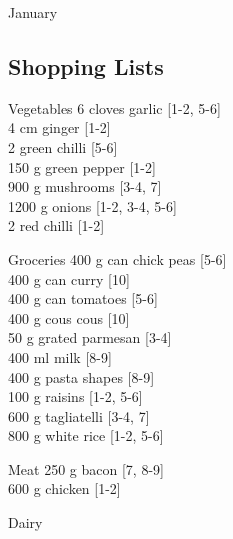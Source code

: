 \begin{menu}{January}
    \subsection*{Shopping Lists}
      \begin{shoppinglist}{Vegetables}
      6 cloves garlic 
        {\scriptsize[1-2, 5-6]}\\
      4 cm ginger 
        {\scriptsize[1-2]}\\
      2  green chilli 
        {\scriptsize[5-6]}\\
      150 g green pepper 
        {\scriptsize[1-2]}\\
      900 g mushrooms 
        {\scriptsize[3-4, 7]}\\
      1200 g onions 
        {\scriptsize[1-2, 3-4, 5-6]}\\
      2  red chilli 
        {\scriptsize[1-2]}\\
      \end{shoppinglist}%
      \begin{shoppinglist}{Groceries}
      400 g can chick peas 
        {\scriptsize[5-6]}\\
      400 g can curry 
        {\scriptsize[10]}\\
      400 g can tomatoes 
        {\scriptsize[5-6]}\\
      400 g cous cous 
        {\scriptsize[10]}\\
      50 g grated parmesan 
        {\scriptsize[3-4]}\\
      400 ml milk 
        {\scriptsize[8-9]}\\
      400 g pasta shapes 
        {\scriptsize[8-9]}\\
      100 g raisins 
        {\scriptsize[1-2, 5-6]}\\
      600 g tagliatelli 
        {\scriptsize[3-4, 7]}\\
      800 g white rice 
        {\scriptsize[1-2, 5-6]}\\
      \end{shoppinglist}%
      \par\vfil %
      \begin{shoppinglist}{Meat}
      250 g bacon 
        {\scriptsize[7, 8-9]}\\
      600 g chicken 
        {\scriptsize[1-2]}\\
      \end{shoppinglist}%
      \begin{shoppinglist}{Dairy}

\end{shoppinglist}
\end{menu}
